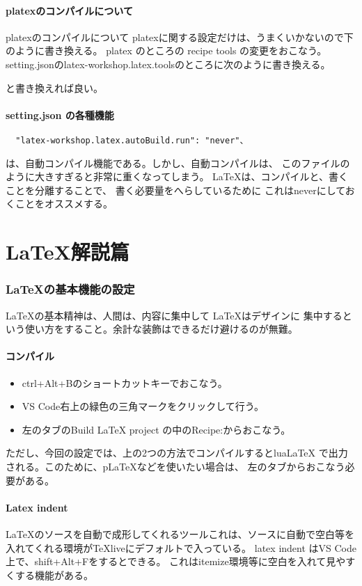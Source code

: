 \documentclass{ltjsarticle}
\begin{document}
\subsection{platexのコンパイルについて}
platexのコンパイルについて
platexに関する設定だけは、うまくいかないので下のように書き換える。
platex のところの
recipe tools の変更をおこなう。
setting.jsonのlatex-workshop.latex.toolsのところに次のように書き換える。

と書き換えれば良い。
\subsection{setting.json の各種機能}
\begin{verbatim}
  "latex-workshop.latex.autoBuild.run": "never"、
\end{verbatim}
は、自動コンパイル機能である。しかし、自動コンパイルは、
このファイルのように大きすぎると非常に重くなってしまう。
\LaTeX は、コンパイルと、書くことを分離することで、
書く必要量をへらしているために
これはneverにしておくことをオススメする。

\part{\LaTeX 解説篇}
\section{\LaTeX の基本機能の設定}
\LaTeX の基本精神は、人間は、内容に集中して \LaTeX はデザインに
集中するという使い方をすること。余計な装飾はできるだけ避けるのが無難。
\subsection{コンパイル}
\begin{itemize}
  \item ctrl+Alt+Bのショートカットキーでおこなう。
  \item VS Code右上の緑色の三角マークをクリックして行う。
  \item 左のタブのBuild LaTeX project の中のRecipe:からおこなう。
\end{itemize}
ただし、今回の設定では、上の2つの方法でコンパイルするとlua\LaTeX
で出力される。このために、pLaTeXなどを使いたい場合は、
左のタブからおこなう必要がある。
\subsection{Latex indent}
LaTeXのソースを自動で成形してくれるツールこれは、ソースに自動で空白等を
入れてくれる環境がTeXliveにデフォルトで入っている。
latex indent はVS Code上で、shift+Alt+Fをするとできる。
これはitemize環境等に空白を入れて見やすくする機能がある。
\end{document}

